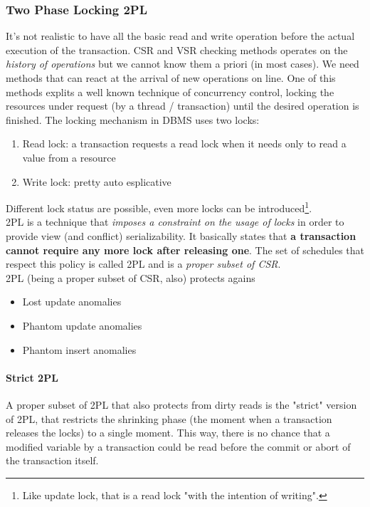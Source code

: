 \documentclass{article}
\begin{document}
				\subsubsection{Two Phase Locking 2PL}
					It's not realistic to have all the basic read and write operation before the actual execution of the transaction. CSR and VSR checking methods operates on the \textit{history of operations} but we cannot know them a priori (in most cases). We need methods that can react at the arrival of new operations on line. One of this methods explits a well known technique of concurrency control, locking the resources under request (by a thread / transaction) until the desired operation is finished. The locking mechanism in DBMS uses two locks:
					\begin{enumerate}
						\item Read lock: a transaction requests a read lock when it needs only to read a value from a resource
						\item Write lock: pretty auto esplicative
					\end{enumerate}
					Different lock status are possible, even more locks can be introduced\footnote{Like update lock, that is a read lock "with the intention of writing".}.\\
					2PL is a technique that \textit{imposes a constraint on the usage of locks} in order to provide view (and conflict) serializability. It basically states that \textbf{a transaction cannot require any more lock after releasing one}. The set of schedules that respect this policy is called 2PL and is a \textit{proper subset of CSR}.\\
					2PL (being a proper subset of CSR, also) protects agains
					\begin{itemize}
						\item Lost update anomalies
						\item Phantom update anomalies
						\item Phantom insert anomalies
					\end{itemize}

					\paragraph{Strict 2PL}
						A proper subset of 2PL that also protects from dirty reads is the "strict" version of 2PL, that restricts the shrinking phase (the moment when a transaction releases the locks) to a single moment. This way, there is no chance that a modified variable by a transaction could be read before the commit or abort of the transaction itself.
\end{document}
